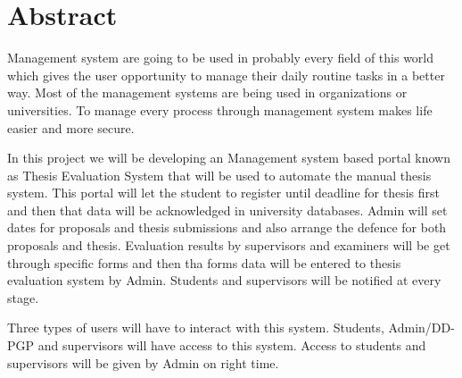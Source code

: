 \chapter*{Abstract}

Management system are going to be used in probably every field of this world which gives the user opportunity to manage their daily routine tasks in a better way. Most of the management systems are being used in organizations or universities. To manage every process through management system  makes life easier and more secure. 

In this project we will be developing an Management system based portal known as Thesis Evaluation System that will be used to automate the manual thesis system. This portal will let the student to register until deadline for thesis first and then that data will be acknowledged in university databases. Admin will set dates for proposals and thesis submissions and also arrange the defence for both proposals and thesis. Evaluation results by supervisors and examiners will be get through specific forms and then tha forms data will be entered to thesis evaluation system by Admin. Students and supervisors will be notified at every stage.

Three types of users will have to interact with this system. Students, Admin/DD-PGP and supervisors will have access to this system. Access to students and supervisors will be given by Admin on right time.